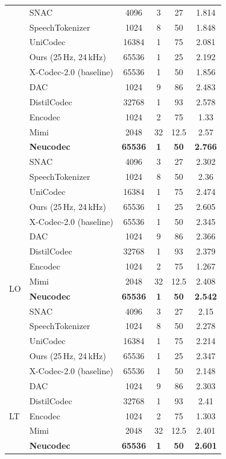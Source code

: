 \documentclass[preprint]{article}
\begin{document}
\begin{longtable}{llcccc}
  & SNAC & 4096 & 3 & 27 & 1.814 \\
  & SpeechTokenizer & 1024 & 8 & 50 & 1.848 \\
  & UniCodec & 16384 & 1 & 75 & 2.081 \\
  & Ours (25\,Hz, 24\,kHz) & 65536 & 1 & 25 & 2.192 \\
  & X-Codec-2.0 (baseline) & 65536 & 1 & 50 & 1.856 \\
\newpage
\multirow{8}{*}{LIJ}
  & DAC & 1024 & 9 & 86 & 2.483 \\
  & DistilCodec & 32768 & 1 & 93 & 2.578 \\
  & Encodec & 1024 & 2 & 75 & 1.33 \\
  & Mimi & 2048 & 32 & 12.5 & 2.57 \\
  & \textbf{Neucodec} & \textbf{65536} & \textbf{1} & \textbf{50} & \textbf{2.766} \\
  & SNAC & 4096 & 3 & 27 & 2.302 \\
  & SpeechTokenizer & 1024 & 8 & 50 & 2.36 \\
  & UniCodec & 16384 & 1 & 75 & 2.474 \\
  & Ours (25\,Hz, 24\,kHz) & 65536 & 1 & 25 & 2.605 \\
  & X-Codec-2.0 (baseline) & 65536 & 1 & 50 & 2.345 \\
\midrule
\multirow{8}{*}{LO}
  & DAC & 1024 & 9 & 86 & 2.366 \\
  & DistilCodec & 32768 & 1 & 93 & 2.379 \\
  & Encodec & 1024 & 2 & 75 & 1.267 \\
  & Mimi & 2048 & 32 & 12.5 & 2.408 \\
  & \textbf{Neucodec} & \textbf{65536} & \textbf{1} & \textbf{50} & \textbf{2.542} \\
  & SNAC & 4096 & 3 & 27 & 2.15 \\
  & SpeechTokenizer & 1024 & 8 & 50 & 2.278 \\
  & UniCodec & 16384 & 1 & 75 & 2.214 \\
  & Ours (25\,Hz, 24\,kHz) & 65536 & 1 & 25 & 2.347 \\
  & X-Codec-2.0 (baseline) & 65536 & 1 & 50 & 2.148 \\
\midrule
\multirow{8}{*}{LT}
  & DAC & 1024 & 9 & 86 & 2.303 \\
  & DistilCodec & 32768 & 1 & 93 & 2.41 \\
  & Encodec & 1024 & 2 & 75 & 1.303 \\
  & Mimi & 2048 & 32 & 12.5 & 2.401 \\
  & \textbf{Neucodec} & \textbf{65536} & \textbf{1} & \textbf{50} & \textbf{2.601} \\

\end{longtable}
\end{document}
